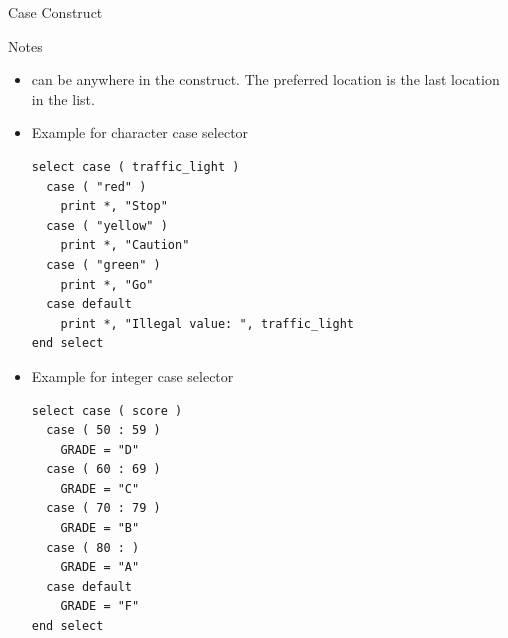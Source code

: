 \documentclass[10pt,t]{beamer}
\begin{document}
\begin{frame}{Case Construct}
\begin{ablock}{Notes}
\begin{itemize}
      \item {} can be anywhere in the  construct. The preferred location is the last location in the  list.
    \end{itemize}
  \end{ablock}
  \framebreak
  \begin{itemize}
    \item Example for character case selector
      \begin{lstlisting}[language={[90]Fortran},basicstyle=\fontsize{6}{7}\selectfont\ttfamily]
select case ( traffic_light )
  case ( "red" )
    print *, "Stop"
  case ( "yellow" )
    print *, "Caution"
  case ( "green" )
    print *, "Go"
  case default
    print *, "Illegal value: ", traffic_light
end select 
      \end{lstlisting}
    \item Example for integer case selector
      \begin{lstlisting}[language={[90]Fortran},basicstyle=\fontsize{6}{7}\selectfont\ttfamily]
select case ( score )
  case ( 50 : 59 )
    GRADE = "D"
  case ( 60 : 69 )
    GRADE = "C"
  case ( 70 : 79 )
    GRADE = "B"
  case ( 80 : ) 
    GRADE = "A"
  case default
    GRADE = "F"
end select
      \end{lstlisting}
  \end{itemize}
\end{frame}
\end{document}
